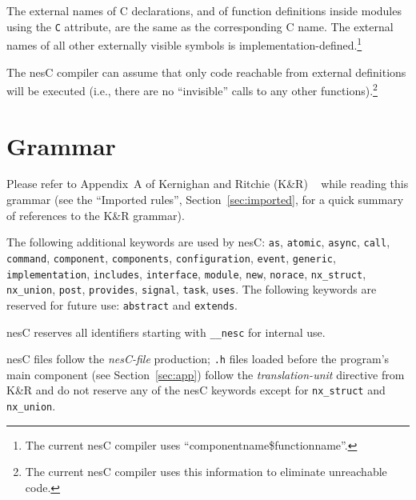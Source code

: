 \documentclass[11pt,letterpaper]{article}
\newcommand{\kw}[1]{{\tt #1}}
\newcommand{\file}[1]{{\tt #1}}
\newcommand{\nesc}{nesC\xspace}
\begin{document}
The external names of C declarations, and of function definitions
inside modules using the \kw{C} attribute, are the same as the
corresponding C name. The external names of all other externally
visible symbols is implementation-defined.\footnote{The current
nesC compiler uses ``componentname\$functionname''.}

The \nesc compiler can assume that only code reachable from external
definitions will be executed (i.e., there are no ``invisible'' calls to any
other functions).\footnote{The current \nesc compiler uses this information
to eliminate unreachable code.}



\appendix

\section{Grammar}
\label{sec:grammar}

Please refer to Appendix~A of Kernighan and Ritchie (K\&R)
~\cite[pp234--239]{kandr} while reading this grammar (see the ``Imported
rules'', Section~\ref{sec:imported}, for a quick summary of references to
the K\&R grammar).

The following additional keywords are used by \nesc: \kw{as}, \kw{atomic},
\kw{async}, \kw{call}, \kw{command}, \kw{component}, \kw{components},
\kw{configuration}, \kw{event}, \kw{generic}, \kw{implementation},
\kw{includes}, \kw{interface}, \kw{module}, \kw{new}, \kw{norace},
\kw{nx\_struct}, \kw{nx\_union}, \kw{post}, \kw{provides}, \kw{signal},
\kw{task}, \kw{uses}. The following keywords are reserved for future use:
\kw{abstract} and \kw{extends}.

\nesc reserves all identifiers starting with \kw{\_\_nesc} for internal
use.

\nesc files follow the \emph{nesC-file} production; \file{.h} files loaded
before the program's main component (see Section~\ref{sec:app}) follow the
\emph{translation-unit} directive from K\&R and do not reserve any of
the \nesc keywords except for \kw{nx\_struct} and \kw{nx\_union}.
\end{document}
